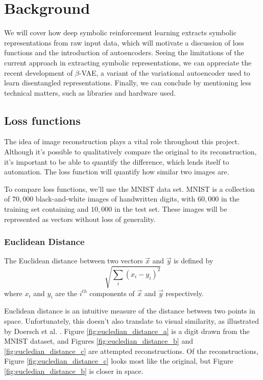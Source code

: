 \chapter{Background}

\label{ch:background}

We will cover how deep symbolic reinforcement learning extracts symbolic representations from raw input data, which will motivate a discussion of loss functions and the introduction of autoencoders. Seeing the limitations of the current approach in extracting symbolic representations, we can appreciate the recent development of $\beta$-VAE, a variant of the variational autoencoder used to learn disentangled representations. Finally, we can conclude by mentioning less technical matters, such as libraries and hardware used.

%
%
%
%
%
\section{Loss functions}

The idea of image reconstruction plays a vital role throughout this project. Although it's possible to qualitatively compare the original to its reconstruction, it's important to be able to quantify the difference, which lends itself to automation. The loss function will quantify how similar two images are.

To compare loss functions, we'll use the MNIST data set. MNIST is a collection of $70,000$ black-and-white images of handwritten digits, with $60,000$ in the training set containing and $10,000$ in the test set. These images will be represented as vectors without loss of generality.

\subsection{Euclidean Distance}

The Euclidean distance between two vectors $\vec{x}$ and $\vec{y}$ is defined by $$\sqrt{\sum_{i}(x_i - y_i)^2}$$ where $x_i$ and $y_i$ are the $i^{th}$ components of $\vec{x}$ and $\vec{y}$ respectively.

Euclidean distance is an intuitive measure of the distance between two points in space. Unfortunately, this doesn't also translate to visual similarity, as illustrated by Doersch et al. \cite{Doersch2016}. Figure \ref{fig:eucledian_distance_a} is a digit drawn from the MNIST dataset, and Figures \ref{fig:eucledian_distance_b} and \ref{fig:eucledian_distance_c} are attempted reconstructions. Of the reconstructions, Figure \ref{fig:eucledian_distance_c} looks most like the original, but Figure \ref{fig:eucledian_distance_b} is closer in space.\\

